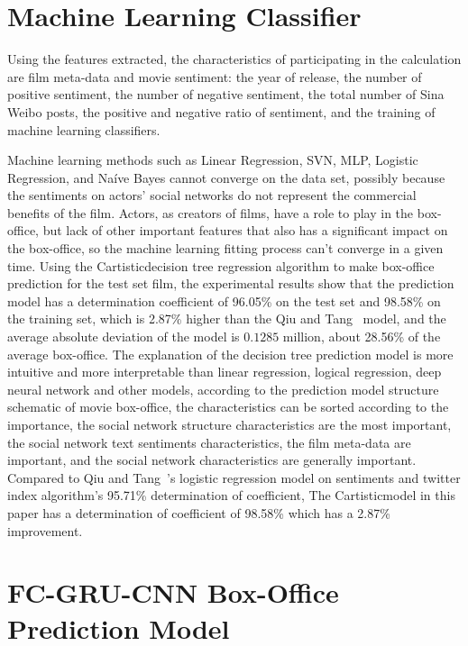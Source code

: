 \documentclass[review]{cvpr}
\begin{document}
\section{Machine Learning Classifier}

Using the features extracted, the characteristics of participating in the calculation are film meta-data and movie sentiment:
the year of release, the number of positive sentiment, the number of negative sentiment, the total number of Sina Weibo posts,
the positive and negative ratio of sentiment, and the training of machine learning classifiers.

Machine learning methods such as Linear Regression, SVN, MLP, Logistic Regression, and Na{\'i}ve Bayes cannot converge on the data set,
possibly because the sentiments on actors' social networks do not represent the commercial benefits of the film.
Actors, as creators of films, have a role to play in the box-office, but lack of other important features that also has a significant impact on the box-office,
so the machine learning fitting process can't converge in a given time.
Using the Cartisticdecision tree regression algorithm to make box-office prediction for the test set film,
the experimental results show that the prediction model has a determination coefficient of 96.05\% on the test set and 98.58\% on the training set, which is 2.87\% higher than the Qiu and Tang~\cite{qiu2018microblog} model,
and the average absolute deviation of the model is $0.1285$ million, about 28.56\% of the average box-office.
The explanation of the decision tree prediction model is more intuitive and more interpretable than linear regression, logical regression, deep neural network and other models,
according to the prediction model structure schematic of movie box-office,
the characteristics can be sorted according to the importance, the social network structure characteristics are the most important,
the social network text sentiments characteristics, the film meta-data are important, and the social network characteristics are generally important.
Compared to Qiu and Tang~\cite{qiu2018microblog}'s logistic regression model on sentiments and twitter index algorithm's 95.71\% determination of coefficient,
The Cartisticmodel in this paper has a determination of coefficient of 98.58\% which has a 2.87\% improvement.

\section{FC-GRU-CNN Box-Office Prediction Model}
\end{document}

